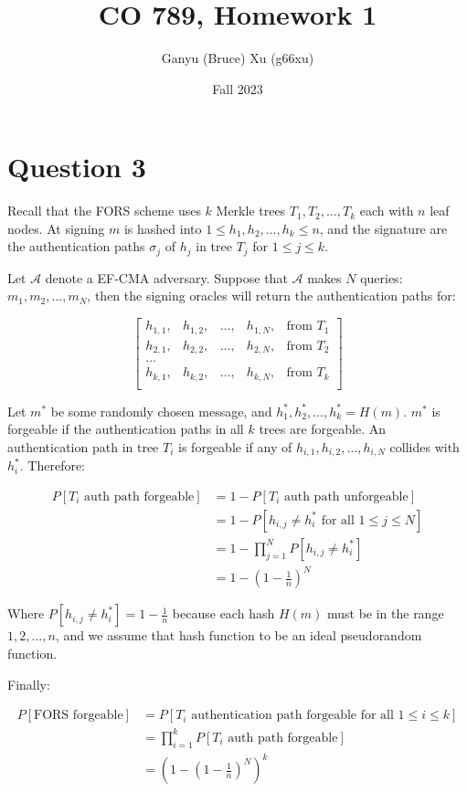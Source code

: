 \documentclass{article}
\title{CO 789, Homework 1}
\author{Ganyu (Bruce) Xu (g66xu)}
\date{Fall 2023}
\begin{document}

\section*{Question 3}
Recall that the FORS scheme uses $k$ Merkle trees $T_1, T_2, \ldots, T_k$ each with $n$ leaf nodes. At signing $m$ is hashed into $1 \leq h_1, h_2, \ldots, h_k \leq n$, and the signature are the authentication paths $\sigma_j$ of $h_j$ in tree $T_j$ for $1 \leq j \leq k$. 

Let $\mathcal{A}$ denote a EF-CMA adversary. Suppose that $\mathcal{A}$ makes $N$ queries: $m_1, m_2, \ldots, m_N$, then the signing oracles will return the authentication paths for:

$$
\begin{bmatrix}
    h_{1, 1}, &h_{1, 2}, &\ldots, &h_{1, N}, &\text{from } T_1 \\
    h_{2, 1}, &h_{2, 2}, &\ldots, &h_{2, N}, &\text{from } T_2 \\
    \ldots \\
    h_{k, 1}, &h_{k, 2}, &\ldots, &h_{k, N}, &\text{from } T_k \\
\end{bmatrix}
$$

Let $m^\ast$ be some randomly chosen message, and $h_1^\ast, h_2^\ast, \ldots, h_k^\ast = H(m)$. $m^\ast$ is forgeable if the authentication paths in all $k$ trees are forgeable. An authentication path in tree $T_i$ is forgeable if any of $h_{i,1}, h_{i,2}, \ldots, h_{i, N}$ collides with $h_i^\ast$. Therefore:

$$
\begin{aligned}
    P[\text{$T_i$ auth path forgeable}] 
    &= 1 - P[\text{$T_i$ auth path unforgeable}] \\
    &= 1 - P[h_{i,j} \neq h_i^\ast \text{ for all } 1 \leq j \leq N] \\
    &= 1 - \prod_{j=1}^N P[h_{i,j} \neq h_i^\ast] \\
    &= 1 - (1 - \frac{1}{n})^N
\end{aligned}
$$

Where $P[h_{i,j} \neq h_i^\ast] = 1 - \frac{1}{n}$ because each hash $H(m)$ must be in the range $1, 2, \ldots, n$, and we assume that hash function to be an ideal pseudorandom function.

Finally:

$$
\begin{aligned}
P[\text{FORS forgeable}]
&= P[\text{$T_i$  authentication path forgeable for all $1 \leq i \leq k$}] \\
&= \prod_{i=1}^k P[\text{$T_i$ auth path forgeable}] \\
&= (1 - (1 - \frac{1}{n})^N)^k
\end{aligned}
$$
\end{document}
